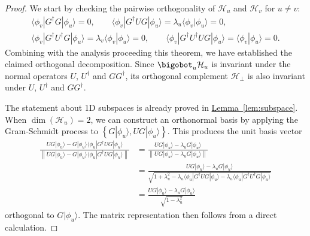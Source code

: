 \documentclass[letterpaper,onecolumn,11pt,accepted=2026-02-14]{quantumarticle}
\newcommand{\norm}[1]{\left\lVert#1\right\rVert}
\theoremstyle{remark}
\theoremstyle{plain}
\newcommand{\lem}[1]{\hyperref[lem:#1]{Lemma~\ref*{lem:#1}}}
\newcommand{\ket}[1]{|#1\rangle}
\newcommand{\bra}[1]{\langle#1|}
\newcommand{\ketbra}[2]{\ket{#1}\!\bra{#2}}
\begin{document}
\begin{proof}
We start by checking the pairwise orthogonality of $\mathcal{H}_u$ and $\mathcal{H}_v$ for $u\neq v$:
\begin{equation}
\begin{aligned}
    \bra{\phi_v}G^\dagger G\ket{\phi_u}=0,\qquad
    \bra{\phi_v}G^\dagger UG\ket{\phi_u}=\lambda_u\langle\phi_v|\phi_u\rangle=0,\\
    \bra{\phi_v}G^\dagger U^\dagger G\ket{\phi_u}=\lambda_v\langle\phi_v|\phi_u\rangle=0,\qquad
    \bra{\phi_v}G^\dagger U^\dagger UG\ket{\phi_u}=\langle\phi_v|\phi_u\rangle=0.
\end{aligned}
\end{equation}
Combining with the analysis proceeding this theorem, we have established the claimed orthogonal decomposition. Since $\bigobot_{u}\mathcal{H}_u$ is invariant under the normal operators $U$, $U^\dagger$ and $GG^\dagger$, its orthogonal complement $\mathcal{H}_\bot$ is also invariant under $U$, $U^\dagger$ and $GG^\dagger$.

The statement about 1D subspaces is already proved in \lem{subspace}. 
When $\dim(\mathcal{H}_u)=2$, we can construct an orthonormal basis by applying the Gram-Schmidt process to $\left\{G\ket{\phi_u},UG\ket{\phi_u}\right\}$. This produces the unit basis vector
\begin{equation}
\begin{aligned}
    \frac{UG\ket{\phi_u}-G\ketbra{\phi_u}{\phi_u}G^\dagger UG\ket{\phi_u}}{\norm{UG\ket{\phi_u}-G\ketbra{\phi_u}{\phi_u}G^\dagger UG\ket{\phi_u}}}
    &=\frac{UG\ket{\phi_u}-\lambda_uG\ket{\phi_u}}{\norm{UG\ket{\phi_u}-\lambda_uG\ket{\phi_u}}}\\
    &=\frac{UG\ket{\phi_u}-\lambda_uG\ket{\phi_u}}{\sqrt{1+\lambda_u^2-\lambda_u\bra{\phi_u}G^\dagger UG\ket{\phi_u}-\lambda_u\bra{\phi_u}G^\dagger U^\dagger G\ket{\phi_u}}}\\
    &=\frac{UG\ket{\phi_u}-\lambda_uG\ket{\phi_u}}{\sqrt{1-\lambda_u^2}}
\end{aligned}
\end{equation}
orthogonal to $G\ket{\phi_u}$. The matrix representation then follows from a direct calculation.
\end{proof}

\end{document}
